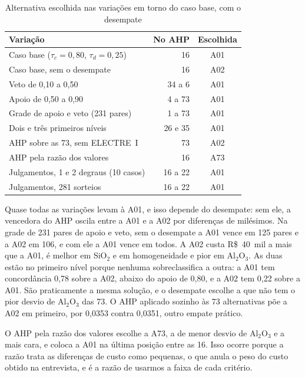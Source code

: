 \documentclass[conference]{IEEEtran}
\begin{document}
\begin{table}[htbp]
\caption{Alternativa escolhida nas variações em torno do caso base, com o desempate}
\centering
\small
\begin{tabular}{p{} r c}
\toprule
\textbf{Variação} & \textbf{No AHP} & \textbf{Escolhida} \\
\midrule
Caso base ($\tau_c=0{,}80$, $\tau_d=0{,}25$) & 16 & A01 \\
Caso base, sem o desempate & 16 & A02 \\
Veto de 0{,}10 a 0{,}50 & 34 a 6 & A01 \\
Apoio de 0{,}50 a 0{,}90 & 4 a 73 & A01 \\
Grade de apoio e veto (231 pares) & 1 a 73 & A01 \\
Dois e três primeiros níveis & 26 e 35 & A01 \\
AHP sobre as 73, sem ELECTRE~I & 73 & A02 \\
AHP pela razão dos valores & 16 & A73 \\
Julgamentos, 1 e 2 degraus (10 casos) & 16 a 22 & A01 \\
Julgamentos, 281 sorteios & 16 a 22 & A01 \\
\bottomrule
\end{tabular}
\label{tab:sens}
\end{table}

Quase todas as variações levam à A01, e isso depende do desempate: sem ele, a vencedora do AHP oscila entre a A01 e a A02 por diferenças de milésimos. Na grade de 231 pares de apoio e veto, sem o desempate a A01 vence em 125 pares e a A02 em 106, e com ele a A01 vence em todos. A A02 custa R\$~40~mil a mais que a A01, é melhor em SiO$_2$ e em homogeneidade e pior em Al$_2$O$_3$. As duas estão no primeiro nível porque nenhuma sobreclassifica a outra: a A01 tem concordância 0{,}78 sobre a A02, abaixo do apoio de 0{,}80, e a A02 tem 0{,}22 sobre a A01. São praticamente a mesma solução, e o desempate escolhe a que não tem o pior desvio de Al$_2$O$_3$ das 73. O AHP aplicado sozinho às 73 alternativas põe a A02 em primeiro, por 0{,}0353 contra 0{,}0351, outro empate prático.

O AHP pela razão dos valores escolhe a A73, a de menor desvio de Al$_2$O$_3$ e a mais cara, e coloca a A01 na última posição entre as 16. Isso ocorre porque a razão trata as diferenças de custo como pequenas, o que anula o peso do custo obtido na entrevista, e é a razão de usarmos a faixa de cada critério.
\end{document}
